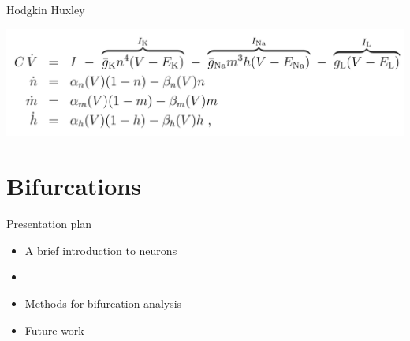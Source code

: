 \documentclass[presentation]{beamer}
\begin{document}
\begin{frame}[label={sec:org78c1368}]{Hodgkin Huxley}
\begin{center}
\includegraphics[width=.9\linewidth]{./hh1.png}
\end{center}
\end{frame}


\section{Bifurcations}
\label{sec:org597cc09}

\begin{frame}[label={sec:orge9c8d42}]{Presentation plan}
\begin{itemize}
\item A brief introduction to neurons
\item \color{bristolred}{Bifurcations as neural encodings}
\item \color{black} Methods for bifurcation analysis
\item Future work
\end{itemize}
\end{frame}
\end{document}
